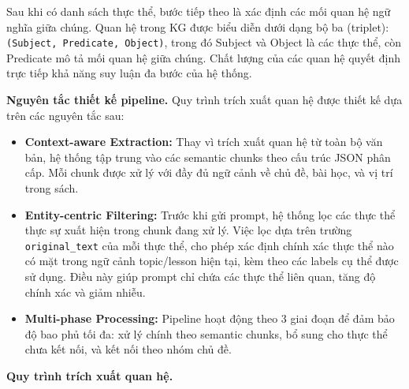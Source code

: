 Sau khi có danh sách thực thể, bước tiếp theo là xác định các mối quan hệ ngữ nghĩa giữa chúng. Quan hệ trong KG được biểu diễn dưới dạng bộ ba (triplet): \texttt{(Subject, Predicate, Object)}, trong đó Subject và Object là các thực thể, còn Predicate mô tả mối quan hệ giữa chúng. Chất lượng của các quan hệ quyết định trực tiếp khả năng suy luận đa bước của hệ thống.

\vspace{0.5em}
\noindent\textbf{Nguyên tắc thiết kế pipeline.}
Quy trình trích xuất quan hệ được thiết kế dựa trên các nguyên tắc sau:

\begin{itemize}
    \item \textbf{Context-aware Extraction:} Thay vì trích xuất quan hệ từ toàn bộ văn bản, hệ thống tập trung vào các semantic chunks theo cấu trúc JSON phân cấp. Mỗi chunk được xử lý với đầy đủ ngữ cảnh về chủ đề, bài học, và vị trí trong sách.
    
    \item \textbf{Entity-centric Filtering:} Trước khi gửi prompt, hệ thống lọc các thực thể thực sự xuất hiện trong chunk đang xử lý. Việc lọc dựa trên trường \texttt{original\_text} của mỗi thực thể, cho phép xác định chính xác thực thể nào có mặt trong ngữ cảnh topic/lesson hiện tại, kèm theo các labels cụ thể được sử dụng. Điều này giúp prompt chỉ chứa các thực thể liên quan, tăng độ chính xác và giảm nhiễu.
    
    \item \textbf{Multi-phase Processing:} Pipeline hoạt động theo 3 giai đoạn để đảm bảo độ bao phủ tối đa: xử lý chính theo semantic chunks, bổ sung cho thực thể chưa kết nối, và kết nối theo nhóm chủ đề.
\end{itemize}

\vspace{0.5em}
\noindent\textbf{Quy trình trích xuất quan hệ.}

